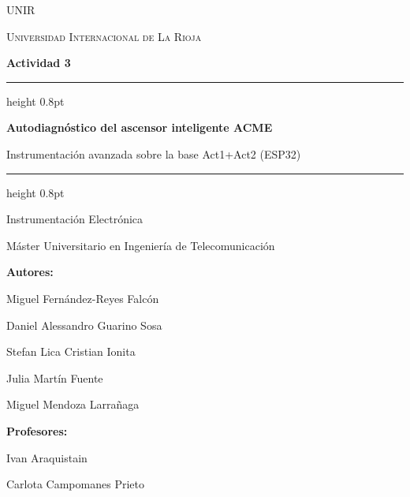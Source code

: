 \begin{titlepage}
\centering

\vspace*{1.5cm}

{\scshape\Large UNIR\par}
{\scshape Universidad Internacional de La Rioja\par}

\vspace{2.5cm}

{\Large\bfseries Actividad 3\par}

\vspace{1.8cm}
\hrule height 0.8pt
\vspace{0.6cm}

{\huge\bfseries Autodiagnóstico del ascensor inteligente ACME\par}
\vspace{0.3cm}
{\Large Instrumentación avanzada sobre la base Act1+Act2 (ESP32)\par}

\vspace{0.6cm}
\hrule height 0.8pt

\vspace{1.5cm}

{\large Instrumentación Electrónica\par}
\vspace{0.3cm}
{\large Máster Universitario en Ingeniería de Telecomunicación\par}

\vfill

\textbf{Autores:}\\[4pt]
{\large Miguel Fernández-Reyes Falcón\par}
{\large Daniel Alessandro Guarino Sosa\par}
{\large Stefan Lica Cristian Ionita\par}
{\large Julia Martín Fuente\par}
{\large Miguel Mendoza Larrañaga\par}

\vspace{1cm}

\textbf{Profesores:}\\[4pt]
{\large Ivan Araquistain\par}
{\large Carlota Campomanes Prieto\par}

\vspace{1.5cm}

\end{titlepage}
